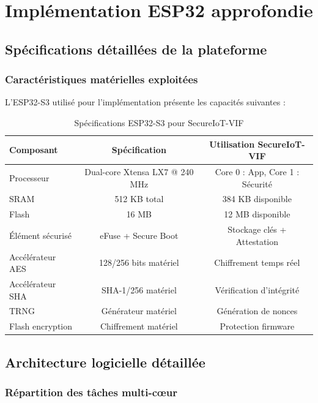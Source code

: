 \section{Implémentation ESP32 approfondie}

\subsection{Spécifications détaillées de la plateforme}

\subsubsection{Caractéristiques matérielles exploitées}

L'ESP32-S3 utilisé pour l'implémentation présente les capacités suivantes :

\begin{table}[h]
\centering
\caption{Spécifications ESP32-S3 pour SecureIoT-VIF}
\label{tab:esp32-specs}
\begin{tabular}{|l|c|c|}
\hline
\textbf{Composant} & \textbf{Spécification} & \textbf{Utilisation SecureIoT-VIF} \\
\hline
Processeur & Dual-core Xtensa LX7 @ 240 MHz & Core 0 : App, Core 1 : Sécurité \\
SRAM & 512 KB total & 384 KB disponible \\
Flash & 16 MB & 12 MB disponible \\
Élément sécurisé & eFuse + Secure Boot & Stockage clés + Attestation \\
Accélérateur AES & 128/256 bits matériel & Chiffrement temps réel \\
Accélérateur SHA & SHA-1/256 matériel & Vérification d'intégrité \\
TRNG & Générateur matériel & Génération de nonces \\
Flash encryption & Chiffrement matériel & Protection firmware \\
\hline
\end{tabular}
\end{table}

\subsection{Architecture logicielle détaillée}

\subsubsection{Répartition des tâches multi-cœur}

